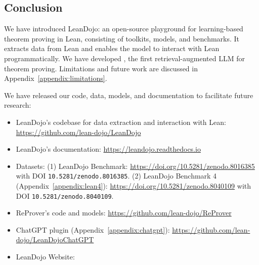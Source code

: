 \subsection{Conclusion}
We have introduced LeanDojo: an open-source playground for learning-based theorem proving in Lean, consisting of toolkits, models, and benchmarks. It extracts data from Lean and enables the model to interact with Lean programmatically. We have developed {\name}, the first retrieval-augmented LLM for theorem proving. Limitations and future work are discussed in Appendix~\ref{appendix:limitations}.

We have released our code, data, models, and documentation to facilitate future research:

\begin{itemize}
    \item LeanDojo's codebase for data extraction and interaction with Lean: \url{https://github.com/lean-dojo/LeanDojo}
    \item LeanDojo's documentation: \url{https://leandojo.readthedocs.io}
    \item Datasets: (1) LeanDojo Benchmark: \url{https://doi.org/10.5281/zenodo.8016385} with DOI \texttt{10.5281/zenodo.8016385}. (2) LeanDojo Benchmark 4 (Appendix~\ref{appendix:lean4}): \url{https://doi.org/10.5281/zenodo.8040109} with DOI \texttt{10.5281/zenodo.8040109}.
    \item ReProver's code and models: \url{https://github.com/lean-dojo/ReProver}
    \item ChatGPT plugin (Appendix~\ref{appendix:chatgpt}): \url{https://github.com/lean-dojo/LeanDojoChatGPT}
    \item LeanDojo Website: \weburl
\end{itemize}

